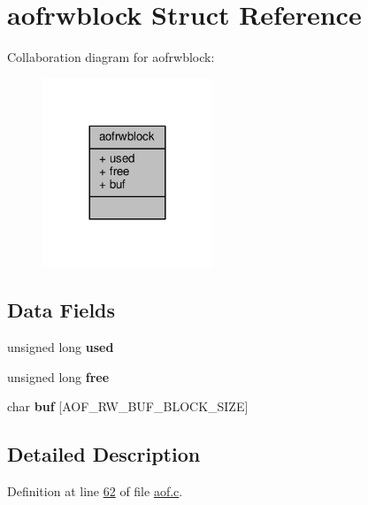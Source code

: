 \hypertarget{structaofrwblock}{}\section{aofrwblock Struct Reference}
\label{structaofrwblock}


Collaboration diagram for aofrwblock\+:\nopagebreak
\begin{figure}[H]
\begin{center}
\leavevmode
\includegraphics[width=144pt]{structaofrwblock__coll__graph}
\end{center}
\end{figure}
\subsection*{Data Fields}
\begin{DoxyCompactItemize}
\item 
\mbox{\label{structaofrwblock_a3169da759f876f081ac1a3b31ac3fae1}} 
unsigned long {\bfseries used}
\item 
\mbox{\label{structaofrwblock_a9eb8333f2c33eb2d1d2cf7e312363bf4}} 
unsigned long {\bfseries free}
\item 
\mbox{\label{structaofrwblock_a6701e9c90e19caa8d66c46e015bcc314}} 
char {\bfseries buf} \mbox{[}A\+O\+F\+\_\+\+R\+W\+\_\+\+B\+U\+F\+\_\+\+B\+L\+O\+C\+K\+\_\+\+S\+I\+ZE\mbox{]}
\end{DoxyCompactItemize}


\subsection{Detailed Description}


Definition at line \hyperlink{aof_8c_source_l00062}{62} of file \hyperlink{aof_8c_source}{aof.\+c}.



